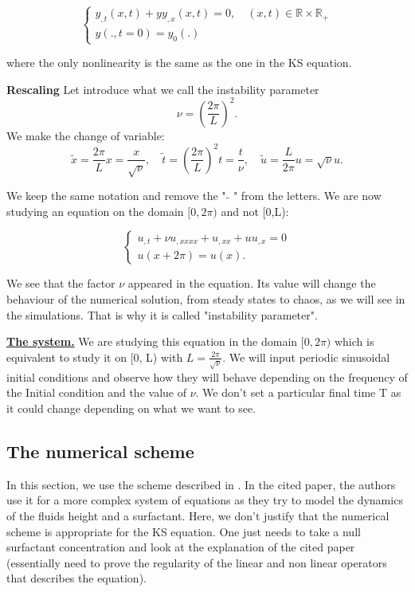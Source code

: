 \documentclass[12pt]{article}
\begin{document}
\begin{equation*}
    \left\{
    \begin{aligned}
        y_{,t}(x, t) + yy_{,x}(x, t) = 0, \quad  (x,t) \in \mathbb{R}\times \mathbb{R}_+\\
        y(., t=0)=y_0(.)
    \end{aligned}
    \right.
\end{equation*}

where the only nonlinearity is the same as the one in the KS equation.

\textbf{Rescaling}
Let introduce what we call the instability parameter \begin{equation}
    \nu = \left( \frac{2\pi}{L}\right)^2.
\end{equation}
We make the change of variable:
\begin{equation}
    \tilde{x}= \frac{2\pi}{L}x = \frac{x}{\sqrt{\nu}},\quad \tilde{t}=\left( \frac{2\pi}{L}\right)^2t =\frac{t}{\nu},\quad  \tilde{u}=\frac{L}{2\pi}u=\sqrt{\nu}u.
\end{equation}

We keep the same notation and remove the " $\tilde{}$ " from the letters. We are now studying an equation on the domain $[0,2\pi)$ and not [0,L): 


\begin{equation}\label{KS_eq_2pi}
\left\{
\begin{aligned}
    u_{,t}  + \nu u_{,xxxx} + u_{,xx} + uu_{,x} = 0 \\
    u(x+2\pi)=u(x). 
\end{aligned}
\right.
\end{equation}

We see that the factor $\nu$ appeared in the equation. Its value will change the behaviour of the numerical solution, from steady states to chaos, as we will see in the simulations. That is why it is called "instability parameter".

\underline{\textbf{The system.}} We are studying this equation in the domain $[0, 2\pi)$ which is equivalent to study it on [0, L) with $L=\frac{2\pi}{\sqrt{\nu}}$. We will input periodic sinusoidal initial conditions and observe how they will behave depending on the frequency of the Initial condition and the value of $\nu$. We don't set a particular final time T as it could change depending on what we want to see.
\subsection{The numerical scheme}
In this section, we use the scheme described in \cite{Scheme_for_KS}. In the cited paper, the authors use it for a more complex system of equations as they try to model the dynamics of the fluids height and a surfactant. 
Here, we don't justify that the numerical scheme is appropriate for the KS equation. One just needs to take a null surfactant concentration and look at the explanation of the cited paper (essentially need to prove the regularity of the linear and non linear operators that describes the equation).  
\end{document}
